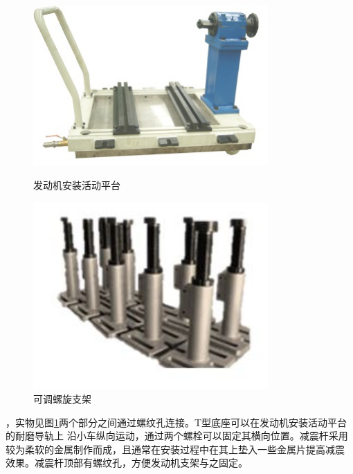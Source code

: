 \begin{figure}[!h]
	\begin{minipage}[h]{0.5\linewidth}
		\includegraphics[width=0.8\textwidth]{thesis_figure/platformer_chapter/hdpt}
		\caption{发动机安装活动平台}
		\label{fig:hdpt}
	\end{minipage}%
	\begin{minipage}[h]{0.5\linewidth}
		\includegraphics[width=0.8\textwidth]{thesis_figure/platformer_chapter/lxzj}
		\caption{可调螺旋支架}
		\label{fig:ktzj}
	\end{minipage}
\end{figure}
，实物见图\ref{fig:ktzj}两个部分之间通过螺纹孔连接。T型底座可以在发动机安装活动平台的耐磨导轨上
沿小车纵向运动，通过两个螺栓可以固定其横向位置。减震杆采用较为柔软的金属制作而成，且通常在安装过程中在其上垫入一些金属片提高减震
效果。减震杆顶部有螺纹孔，方便发动机支架与之固定。
